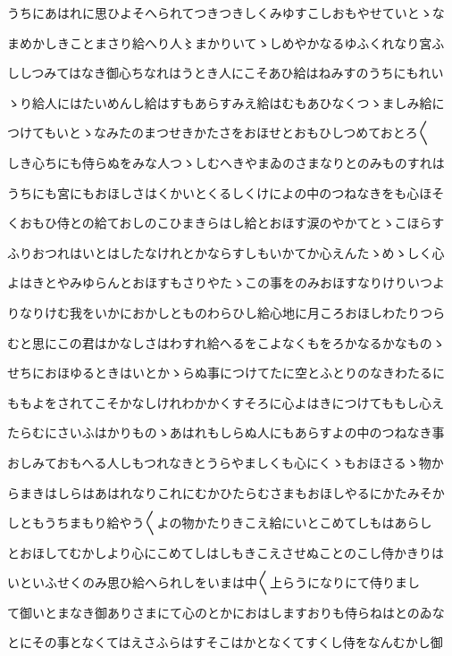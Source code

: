 \documentclass[a4paper,11pt,landscape]{ltjtarticle}
\begin{document}
うちにあはれに思ひよそへられてつきつきしくみゆすこしおもやせていとゝな
\par\medskip
まめかしきことまさり給へり人〻まかりいてゝしめやかなるゆふくれなり宮ふ
\par\medskip
ししつみてはなき御心ちなれはうとき人にこそあひ給はねみすのうちにもれい
\par\medskip
ゝり給人にはたいめんし給はすもあらすみえ給はむもあひなくつゝましみ給に
\par\medskip
つけてもいとゝなみたのまつせきかたさをおほせとおもひしつめておとろ〱
\par\medskip
しき心ちにも侍らぬをみな人つゝしむへきやまゐのさまなりとのみものすれは
\par\medskip
うちにも宮にもおほしさはくかいとくるしくけによの中のつねなきをも心ほそ
\par\medskip
くおもひ侍との給ておしのこひまきらはし給とおほす涙のやかてとゝこほらす
\par\medskip
ふりおつれはいとはしたなけれとかならすしもいかてか心えんたゝめゝしく心
\par\medskip
よはきとやみゆらんとおほすもさりやたゝこの事をのみおほすなりけりいつよ
\par\medskip
りなりけむ我をいかにおかしとものわらひし給心地に月ころおほしわたりつら
\par\medskip
むと思にこの君はかなしさはわすれ給へるをこよなくもをろかなるかなものゝ
\par\medskip
せちにおほゆるときはいとかゝらぬ事につけてたに空とふとりのなきわたるに
\par\medskip
ももよをされてこそかなしけれわかかくすそろに心よはきにつけてももし心え
\par\medskip
たらむにさいふはかりものゝあはれもしらぬ人にもあらすよの中のつねなき事
\par\medskip
おしみておもへる人しもつれなきとうらやましくも心にくゝもおほさるゝ物か
\par\medskip
らまきはしらはあはれなりこれにむかひたらむさまもおほしやるにかたみそか
\par\medskip
しともうちまもり給やう〱よの物かたりきこえ給にいとこめてしもはあらし
\par\medskip
とおほしてむかしより心にこめてしはしもきこえさせぬことのこし侍かきりは
\par\medskip
いといふせくのみ思ひ給へられしをいまは中〱上らうになりにて侍りまし
\par\medskip
て御いとまなき御ありさまにて心のとかにおはしますおりも侍らねはとのゐな
\par\medskip
とにその事となくてはえさふらはすそこはかとなくてすくし侍をなんむかし御
\end{document}
